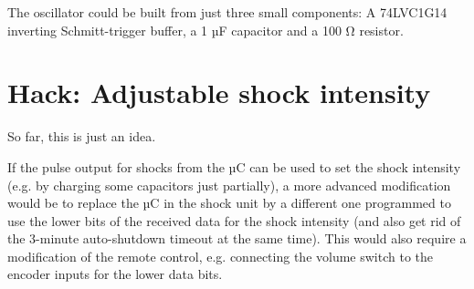 \documentclass[a4paper]{article}
\begin{document}
The oscillator could be built from just three small components: A 74LVC1G14 inverting Schmitt-trigger buffer, a 1 µF capacitor and a 100 \si{\ohm} resistor.

\section{Hack: Adjustable shock intensity}

So far, this is just an idea.

If the pulse output for shocks from the µC can be used to set the shock intensity (e.g. by charging some capacitors just partially), a more advanced modification would be to replace the µC in the shock unit by a different one programmed to use the lower bits of the received data for the shock intensity (and also get rid of the 3-minute auto-shutdown timeout at the same time). This would also require a modification of the remote control, e.g. connecting the volume switch to the encoder inputs for the lower data bits.



\end{document}
